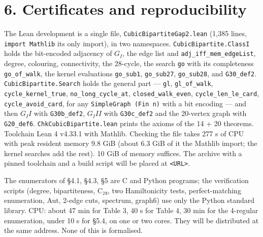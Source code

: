 \documentclass[11pt,a4paper]{article}
\theoremstyle{named}
\begin{document}
\section*{6. Certificates and reproducibility}
The Lean development is a single file, \texttt{CubicBipartiteGap2.\allowbreak{}lean} (1,385 lines, \texttt{import\ \allowbreak{}Mathlib} its only import), in two namespaces. \texttt{CubicBipartite.\allowbreak{}ClassI} holds the bit-encoded adjacency of $G_I$, the edge list and \texttt{adj\_\allowbreak{}iff\_\allowbreak{}mem\_\allowbreak{}edgeList}, degree, colouring, connectivity, the 28-cycle, the search \texttt{go} with its completeness \texttt{go\_\allowbreak{}of\_\allowbreak{}walk}, the kernel evaluations \texttt{go\_\allowbreak{}sub1}, \texttt{go\_\allowbreak{}sub27}, \texttt{go\_\allowbreak{}sub28}, and \texttt{G30\_\allowbreak{}def2}. \texttt{CubicBipartite.\allowbreak{}Search} holds the general part — \texttt{gl}, \texttt{gl\_\allowbreak{}of\_\allowbreak{}walk}, \texttt{cycle\_\allowbreak{}kernel\_\allowbreak{}true}, \texttt{no\_\allowbreak{}long\_\allowbreak{}cycle\_\allowbreak{}at}, \texttt{closed\_\allowbreak{}walk\_\allowbreak{}even}, \texttt{cycle\_\allowbreak{}len\_\allowbreak{}le\_\allowbreak{}card}, \texttt{cycle\_\allowbreak{}avoid\_\allowbreak{}card}, for any \texttt{SimpleGraph\ \allowbreak{}(Fin\ \allowbreak{}n)} with a bit encoding — and then $G_II$ with \texttt{G30b\_\allowbreak{}def2}, $G_III$ with \texttt{G30c\_\allowbreak{}def2} and the 20-vertex graph with \texttt{G20\_\allowbreak{}def6}. \texttt{ChkCubicBipartite.\allowbreak{}lean} prints the axioms of the 14 + 20 theorems. Toolchain Lean 4 v4.33.1 with Mathlib. Checking the file takes 277 s of CPU with peak resident memory 9.8 GiB (about 6.3 GiB of it the Mathlib import; the kernel searches add the rest). 10 GiB of memory suffices. The archive with a pinned toolchain and a build script will be placed at \texttt{\textless{}URL\textgreater{}}.

The enumerators of §4.1, §4.3, §5 are C and Python programs; the verification scripts (degree, bipartiteness, C₂₈, two Hamiltonicity tests, perfect-matching enumeration, Aut, 2-edge cuts, spectrum, graph6) use only the Python standard library. CPU: about 47 min for Table 3, 40 s for Table 4, 30 min for the 4-regular enumeration, under 10 s for §5.4, on one or two cores. They will be distributed at the same address. None of this is formalised.
\end{document}
